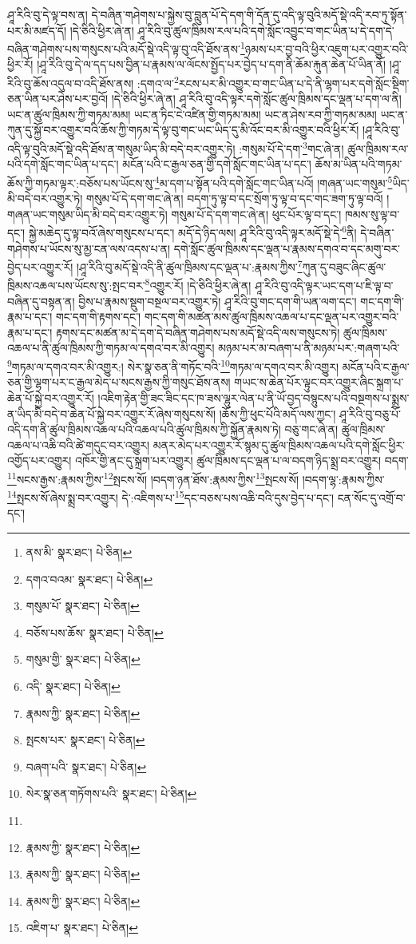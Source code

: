 ཤཱ་རིའི་བུ་དེ་ལྟ་བས་ན། དེ་བཞིན་གཤེགས་པ་སྐྱེས་བུ་བླུན་པོ་དེ་དག་གི་དོན་དུ་འདི་ལྟ་བུའི་མདོ་སྡེ་འདི་རབ་ཏུ་སྟོན་པར་མི་མཛད་དོ། །དེ་ཅིའི་ཕྱིར་ཞེ་ན། ཤཱ་རིའི་བུ་ཚུལ་ཁྲིམས་རལ་པའི་དགེ་སློང་འབྱུང་བ་གང་ཡིན་པ་དེ་དག་དེ་བཞིན་གཤེགས་པས་གསུངས་པའི་མདོ་སྡེ་འདི་ལྟ་བུ་འདི་ཐོས་ནས་\footnote{ནས་མི་  སྣར་ཐང་།  པེ་ཅིན། }ཉམས་པར་བྱ་བའི་ཕྱིར་འཇུག་པར་འགྱུར་བའི་ཕྱིར་རོ། །ཤཱ་རིའི་བུ་དེ་ལ་དད་པས་བྱིན་པ་རྣམས་ལ་ལོངས་སྤྱོད་པར་བྱེད་པ་དག་ནི་ཆོམ་རྐུན་ཆེན་པོ་ཡིན་ནོ། །ཤཱ་རིའི་བུ་ཆོས་འདུལ་བ་འདི་ཐོས་ནས། :དགའ་ལ་\footnote{དགའ་བའམ་  སྣར་ཐང་།  པེ་ཅིན། }རངས་པར་མི་འགྱུར་བ་གང་ཡིན་པ་དེ་ནི་ལྷག་པར་དགེ་སློང་སྡིག་ཅན་ཡིན་པར་ཤེས་པར་བྱའོ། །དེ་ཅིའི་ཕྱིར་ཞེ་ན། ཤཱ་རིའི་བུ་འདི་ལྟར་དགེ་སློང་ཚུལ་ཁྲིམས་དང་ལྡན་པ་དག་ལ་ནི། ཡང་ན་ཚུལ་ཁྲིམས་ཀྱི་གཏམ་མམ། ཡང་ན་ཏིང་ངེ་འཛིན་གྱི་གཏམ་མམ། ཡང་ན་ཤེས་རབ་ཀྱི་གཏམ་མམ། ཡང་ན་ཀུན་དུ་སྐྱོ་བར་འགྱུར་བའི་ཆོས་ཀྱི་གཏམ་དེ་ལྟ་བུ་གང་ཡང་ཡིད་དུ་མི་འོང་བར་མི་འགྱུར་བའི་ཕྱིར་རོ། །ཤཱ་རིའི་བུ་འདི་ལྟ་བུའི་མདོ་སྡེ་འདི་ཐོས་ན་གསུམ་ཡིད་མི་བདེ་བར་འགྱུར་ཏེ། :གསུམ་པོ་དེ་དག་\footnote{གསུམ་པོ་  སྣར་ཐང་།  པེ་ཅིན། }གང་ཞེ་ན། ཚུལ་ཁྲིམས་རལ་པའི་དགེ་སློང་གང་ཡིན་པ་དང་། མངོན་པའི་ང་རྒྱལ་ཅན་གྱི་དགེ་སློང་གང་ཡིན་པ་དང་། ཆོས་མ་ཡིན་པའི་གཏམ་ཆོས་ཀྱི་གཏམ་ལྟར་:བཅོས་པས་ཡོངས་སུ་\footnote{བཅོས་པས་ཆོས་  སྣར་ཐང་།  པེ་ཅིན། }མ་དག་པ་སྟོན་པའི་དགེ་སློང་གང་ཡིན་པའོ། །གཞན་ཡང་གསུམ་\footnote{གསུམ་གྱི་  སྣར་ཐང་།  པེ་ཅིན། }ཡིད་མི་བདེ་བར་འགྱུར་ཏེ། གསུམ་པོ་དེ་དག་གང་ཞེ་ན། བདག་ཏུ་ལྟ་བ་དང་སྲོག་ཏུ་ལྟ་བ་དང་གང་ཟག་ཏུ་ལྟ་བའོ། །གཞན་ཡང་གསུམ་ཡིད་མི་བདེ་བར་འགྱུར་ཏེ། གསུམ་པོ་དེ་དག་གང་ཞེ་ན། ཕུང་པོར་ལྟ་བ་དང་། ཁམས་སུ་ལྟ་བ་དང་། སྐྱེ་མཆེད་དུ་ལྟ་བའོ་ཞེས་གསུངས་པ་དང་། མདོ་དེ་ཉིད་ལས། ཤཱ་རིའི་བུ་འདི་ལྟར་མདོ་སྡེ་དེ་\footnote{འདི་  སྣར་ཐང་།  པེ་ཅིན། }ནི། དེ་བཞིན་གཤེགས་པ་ཡོངས་སུ་མྱ་ངན་ལས་འདས་པ་ན། དགེ་སློང་ཚུལ་ཁྲིམས་དང་ལྡན་པ་རྣམས་དགའ་བ་དང་མགུ་བར་བྱེད་པར་འགྱུར་རོ། །ཤཱ་རིའི་བུ་མདོ་སྡེ་འདི་ནི་ཚུལ་ཁྲིམས་དང་ལྡན་པ་:རྣམས་ཀྱིས་\footnote{རྣམས་ཀྱི་  སྣར་ཐང་།  པེ་ཅིན། }ཀུན་དུ་བཟུང་ཞིང་ཚུལ་ཁྲིམས་འཆལ་པས་ཡོངས་སུ་:སྤང་བར་\footnote{སྤངས་པར་  སྣར་ཐང་།  པེ་ཅིན། }འགྱུར་རོ། །དེ་ཅིའི་ཕྱིར་ཞེ་ན། ཤཱ་རིའི་བུ་འདི་ལྟར་ཡང་དག་པ་ཇི་ལྟ་བ་བཞིན་དུ་བསྟན་ན། བྱིས་པ་རྣམས་སྡུག་བསྔལ་བར་འགྱུར་ཏེ། ཤཱ་རིའི་བུ་གང་དག་གི་ཡན་ལག་དང་། གང་དག་གི་རྣམ་པ་དང་། གང་དག་གི་རྟགས་དང་། གང་དག་གི་མཚན་མས་ཚུལ་ཁྲིམས་འཆལ་པ་དང་ལྡན་པར་འགྱུར་བའི་རྣམ་པ་དང་། རྟགས་དང་མཚན་མ་དེ་དག་དེ་བཞིན་གཤེགས་པས་མདོ་སྡེ་འདི་ལས་གསུངས་ཏེ། ཚུལ་ཁྲིམས་འཆལ་པ་ནི་ཚུལ་ཁྲིམས་ཀྱི་གཏམ་ལ་དགའ་བར་མི་འགྱུར། མཉམ་པར་མ་བཞག་པ་ནི་མཉམ་པར་:གཞག་པའི་\footnote{བཞག་པའི་  སྣར་ཐང་།  པེ་ཅིན། }གཏམ་ལ་དགའ་བར་མི་འགྱུར:། སེར་སྣ་ཅན་ནི་གཏོང་བའི་\footnote{སེར་སྣ་ཅན་གཏོགས་པའི་  སྣར་ཐང་།  པེ་ཅིན། }གཏམ་ལ་དགའ་བར་མི་འགྱུར། མངོན་པའི་ང་རྒྱལ་ཅན་གྱི་ལྷག་པར་ང་རྒྱལ་མེད་པ་སངས་རྒྱས་ཀྱི་གསུང་ཐོས་ནས། གཡང་ས་ཆེན་པོར་ལྟུང་བར་འགྱུར་ཞིང་སྐྲག་པ་ཆེན་པོ་སྐྱེ་བར་འགྱུར་རོ། །འཇིག་རྟེན་གྱི་ཟང་ཟིང་དང་ཁ་ཟས་ལྷུར་ལེན་པ་ནི་ཡོ་བྱད་བསྙུངས་པའི་བསྔགས་པ་སྨྲས་ན་ཡིད་མི་བདེ་བ་ཆེན་པོ་སྐྱེ་བར་འགྱུར་རོ་ཞེས་གསུངས་སོ། །ཆོས་ཀྱི་ཕུང་པོའི་མདོ་ལས་ཀྱང་། ཤཱ་རིའི་བུ་བཅུ་པོ་འདི་དག་ནི་ཚུལ་ཁྲིམས་འཆལ་པའི་འཆལ་པའི་ཚུལ་ཁྲིམས་ཀྱི་སྐྱོན་རྣམས་ཏེ། བཅུ་གང་ཞེ་ན། ཚུལ་ཁྲིམས་འཆལ་པ་འཆི་བའི་ཚེ་གདུང་བར་འགྱུར། མནར་མེད་པར་འགྱུར་རོ་སྙམ་དུ་ཚུལ་ཁྲིམས་འཆལ་པའི་དགེ་སློང་ཕྱིར་འགྱོད་པར་འགྱུར། འཁོར་གྱི་ནང་དུ་སྐྲག་པར་འགྱུར། ཚུལ་ཁྲིམས་དང་ལྡན་པ་ལ་བདག་ཉིད་སྨྲ་བར་འགྱུར། བདག་\footnote{}སངས་རྒྱས་:རྣམས་ཀྱིས་\footnote{རྣམས་ཀྱི་  སྣར་ཐང་།  པེ་ཅིན། }སྤངས་སོ། །བདག་ཉན་ཐོས་:རྣམས་ཀྱིས་\footnote{རྣམས་ཀྱི་  སྣར་ཐང་།  པེ་ཅིན། }སྤངས་སོ། །བདག་ལྷ་:རྣམས་ཀྱིས་\footnote{རྣམས་ཀྱི་  སྣར་ཐང་།  པེ་ཅིན། }སྤངས་སོ་ཞེས་སྨྲ་བར་འགྱུར། དེ་:འཇིགས་པ་\footnote{འཇིག་པ་  སྣར་ཐང་།  པེ་ཅིན། }དང་བཅས་པས་འཆི་བའི་དུས་བྱེད་པ་དང་། ངན་སོང་དུ་འགྲོ་བ་དང་། 